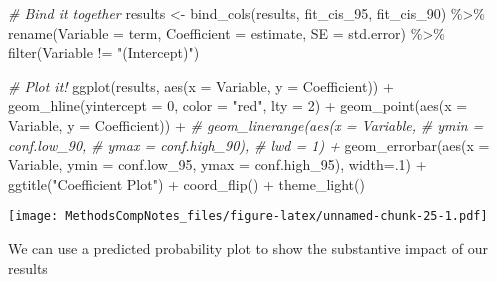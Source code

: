 \documentclass[
]{article}
\newenvironment{Shaded}{\begin{snugshade}}{\end{snugshade}}
\newcommand{\AttributeTok}[1]{\textcolor[rgb]{0.77,0.63,0.00}{#1}}
\newcommand{\CommentTok}[1]{\textcolor[rgb]{0.56,0.35,0.01}{\textit{#1}}}
\newcommand{\DecValTok}[1]{\textcolor[rgb]{0.00,0.00,0.81}{#1}}
\newcommand{\FunctionTok}[1]{\textcolor[rgb]{0.00,0.00,0.00}{#1}}
\newcommand{\NormalTok}[1]{#1}
\newcommand{\OtherTok}[1]{\textcolor[rgb]{0.56,0.35,0.01}{#1}}
\newcommand{\SpecialCharTok}[1]{\textcolor[rgb]{0.00,0.00,0.00}{#1}}
\newcommand{\StringTok}[1]{\textcolor[rgb]{0.31,0.60,0.02}{#1}}
\begin{document}
\begin{Shaded}
\begin{Highlighting}[]
\CommentTok{\# Bind it together}
\NormalTok{results }\OtherTok{\textless{}{-}} \FunctionTok{bind\_cols}\NormalTok{(results, }
\NormalTok{                     fit\_cis\_95, }
\NormalTok{                     fit\_cis\_90) }\SpecialCharTok{\%\textgreater{}\%}
           \FunctionTok{rename}\NormalTok{(}\AttributeTok{Variable =}\NormalTok{ term,}
                  \AttributeTok{Coefficient =}\NormalTok{ estimate,}
                  \AttributeTok{SE =}\NormalTok{ std.error) }\SpecialCharTok{\%\textgreater{}\%}
           \FunctionTok{filter}\NormalTok{(Variable }\SpecialCharTok{!=} \StringTok{"(Intercept)"}\NormalTok{)}

\CommentTok{\# Plot it!}
\FunctionTok{ggplot}\NormalTok{(results, }\FunctionTok{aes}\NormalTok{(}\AttributeTok{x =}\NormalTok{ Variable, }\AttributeTok{y =}\NormalTok{ Coefficient)) }\SpecialCharTok{+}
        \FunctionTok{geom\_hline}\NormalTok{(}\AttributeTok{yintercept =} \DecValTok{0}\NormalTok{, }\AttributeTok{color =} \StringTok{"red"}\NormalTok{, }\AttributeTok{lty =} \DecValTok{2}\NormalTok{) }\SpecialCharTok{+}
        \FunctionTok{geom\_point}\NormalTok{(}\FunctionTok{aes}\NormalTok{(}\AttributeTok{x =}\NormalTok{ Variable, }
                    \AttributeTok{y =}\NormalTok{ Coefficient)) }\SpecialCharTok{+} 
        \CommentTok{\# geom\_linerange(aes(x = Variable, }
        \CommentTok{\#              ymin = conf.low\_90,}
        \CommentTok{\#              ymax = conf.high\_90),}
        \CommentTok{\#            lwd = 1) +}
        \FunctionTok{geom\_errorbar}\NormalTok{(}\FunctionTok{aes}\NormalTok{(}\AttributeTok{x =}\NormalTok{ Variable, }
                     \AttributeTok{ymin =}\NormalTok{ conf.low\_95,}
                     \AttributeTok{ymax =}\NormalTok{ conf.high\_95),}
                     \AttributeTok{width=}\NormalTok{.}\DecValTok{1}\NormalTok{) }\SpecialCharTok{+} 
        \FunctionTok{ggtitle}\NormalTok{(}\StringTok{"Coefficient Plot"}\NormalTok{) }\SpecialCharTok{+}
        \FunctionTok{coord\_flip}\NormalTok{() }\SpecialCharTok{+}
  \FunctionTok{theme\_light}\NormalTok{()}
\end{Highlighting}
\end{Shaded}

\texttt{[image: MethodsCompNotes\_files/figure-latex/unnamed-chunk-25-1.pdf]}

We can use a predicted probability plot to show the substantive impact
of our results
\end{document}
